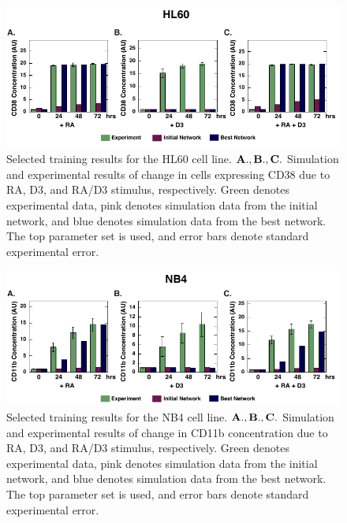 \documentclass[12pt]{article}
\begin{document}
\begin{figure}\centering
\includegraphics[width=1.0\textwidth]{./figs_chp3/Cell_Line_New/WTHL60_Experiment_10.pdf}
\caption{Selected training results for the HL60  cell line. $\bf{A., B., C.}$ Simulation and experimental results of change in cells expressing CD38 due to RA, D3, and RA/D3 stimulus, respectively. Green denotes experimental data, pink denotes simulation data from the initial network, and blue denotes simulation data from the best network. The top parameter set is used, and error bars denote standard experimental error.}
\label{fg:WTHL60_Experiment}
\end{figure}
\clearpage

\begin{figure}\centering
\includegraphics[width=1.0\textwidth]{./figs_chp3/Cell_Line_New/NB4_Experiment_11.pdf}
\caption{Selected training results for the NB4 cell line. $\bf{A., B., C.}$ Simulation and experimental results of change in CD11b concentration due to RA, D3, and RA/D3 stimulus, respectively. Green denotes experimental data, pink denotes simulation data from the initial network, and blue denotes simulation data from the best network. The top parameter set is used, and error bars denote standard experimental error.}
\label{fg:NB4_Experiment}
\end{figure}
\clearpage
\end{document}
